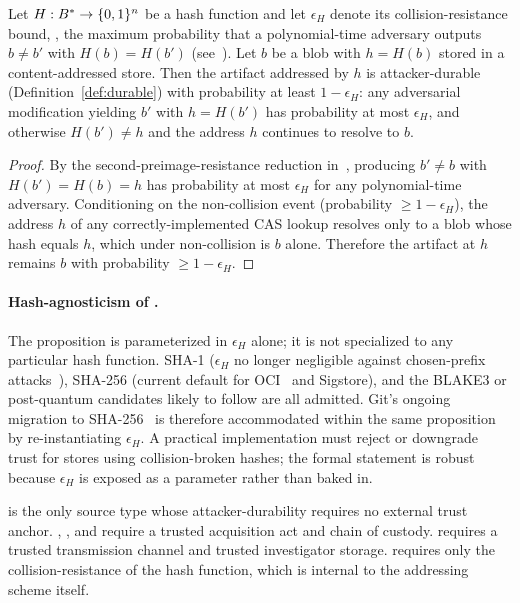 \begin{proposition}
\label{prop:c-durability}
Let $H : B^{*} \to \{0,1\}^n$ be a hash function and let $\epsilon_H$
denote its collision-resistance bound, \ie{}, the maximum probability that
a polynomial-time adversary outputs $b \neq b'$ with $H(b) = H(b')$
(see~\cite{rogaway2004hash}). Let $b$ be a blob with $h = H(b)$ stored in a
content-addressed store. Then the artifact addressed by $h$ is
attacker-durable (Definition~\ref{def:durable}) with probability at least
$1 - \epsilon_H$: any adversarial modification yielding $b'$ with $h =
H(b')$ has probability at most $\epsilon_H$, and otherwise $H(b') \neq h$
and the address $h$ continues to resolve to $b$.
\end{proposition}

\begin{proof}
By the second-preimage-resistance reduction in~\cite{rogaway2004hash},
producing $b' \neq b$ with $H(b') = H(b) = h$ has probability at most
$\epsilon_H$ for any polynomial-time adversary. Conditioning on the
non-collision event (probability $\geq 1 - \epsilon_H$), the address $h$
of any correctly-implemented CAS lookup resolves only to a blob whose hash
equals $h$, which under non-collision is $b$ alone. Therefore the artifact
at $h$ remains $b$ with probability $\geq 1 - \epsilon_H$. \qedhere
\end{proof}

\paragraph{Hash-agnosticism of .}
The proposition is parameterized in $\epsilon_H$ alone; it is not
specialized to any particular hash function. SHA-1
($\epsilon_H$ no longer negligible against chosen-prefix
attacks~\cite{stevens2017sha1,leurent2020sha1chosen}), SHA-256 (current
default for OCI~\cite{ociimagespec_digest} and Sigstore), and the BLAKE3
or post-quantum candidates likely to follow are all admitted. Git's
ongoing migration to SHA-256~\cite{git2020sha256} is therefore
accommodated within the same proposition by re-instantiating $\epsilon_H$.
A practical implementation must reject or downgrade trust for stores using
collision-broken hashes; the formal statement is robust because
$\epsilon_H$ is exposed as a parameter rather than baked in.

\begin{corollary}
\label{cor:c-anchor-free}
 is the only source type whose attacker-durability requires no
external trust anchor. , , and  require a trusted
acquisition act and chain of custody.  requires a trusted transmission
channel and trusted investigator storage.  requires only the
collision-resistance of the hash function, which is internal to the
addressing scheme itself.
\end{corollary}

